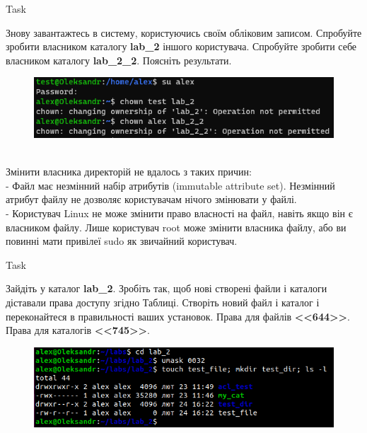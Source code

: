 \documentclass[a4paper,12pt]{article}
\newcommand{\RomanNumeralCaps}[1]{\MakeUppercase{\romannumeral #1}}
\begin{document}
    \begin{center}
        \Large{Task \RomanNumeralCaps{12}}
    \end{center}
    Знову завантажтесь в систему, користуючись своїм обліковим записом. Спробуйте зробити власником каталогу \textbf{lab\_2} іншого користувача. Спробуйте зробити 
    себе власником каталогу \textbf{lab\_2\_2}. Поясніть результати.
    \begin{figure}[h!]
        \begin{minipage}[h]{1\linewidth}
            \centering
            \includegraphics[width=0.6\linewidth]{Prt sc/Figure_12.png}  
        \end{minipage}
    \end{figure} \\
    Змінити власника директорій не вдалось з таких причин: \\
    - Файл має незмінний набір атрибутів (immutable attribute set).  Незмінний атрибут файлу не дозволяє користувачам нічого змінювати у файлі. \\
    - Користувач Linux не може змінити право власності на файл, навіть якщо він є власником файлу.  
    Лише користувач root може змінити власника файлу, або ви повинні мати привілеї sudo як звичайний користувач. 

    \begin{center}
        \Large{Task \RomanNumeralCaps{13}}
    \end{center}
    Зайдіть у каталог \textbf{lab\_2}. Зробіть так, щоб нові створені файли і каталоги діставали права доступу згідно Таблиці. Створіть новий файл і каталог і переконайтеся в
    правильності ваших установок. Права для файлів \textbf{<<644>>}. Права для каталогів \textbf{<<745>>}.
    \begin{figure}[h!]
        \begin{minipage}[h]{1\linewidth}
            \centering
            \includegraphics[width=0.6\linewidth]{Prt sc/Figure_13.png}  
        \end{minipage}
    \end{figure}
\end{document}
